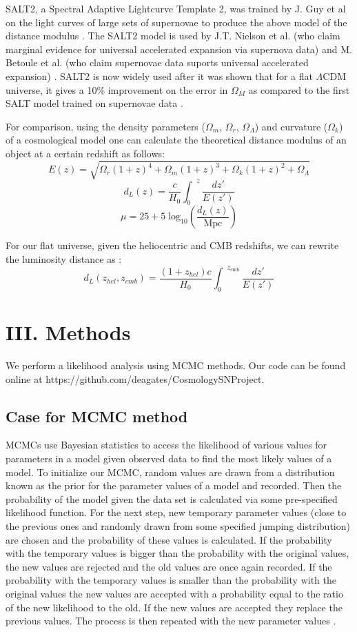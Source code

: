 \documentclass[aps,prl,reprint]{revtex4-1}
\begin{document}
SALT2, a Spectral Adaptive Lightcurve Template 2, was trained by J. Guy et al on the light curves of large sets of supernovae to produce the above model of the distance modulus \cite{salt2}. The SALT2 model is used by J.T. Nielson et al. (who claim marginal evidence for universal accelerated expansion via supernova data) and M. Betoule et al. (who claim supernovae data suports universal accelerated expansion) \cite{shocker,sdss}. SALT2 is now widely used after it was shown that for a flat $\Lambda$CDM universe, it gives a 10\% improvement on the error in $\Omega_M$ as compared to the first SALT model trained on supernovae data \cite{salt2}.

For comparison, using the density parameters ($\Omega_m$, $\Omega_{r}$, $\Omega_{\Lambda}$) and curvature ($\Omega_k$) of a cosmological model one can calculate the theoretical distance modulus of an object at a certain redshift as follows:  
$$E(z)=\sqrt{\Omega_{r}(1+z)^4 + \Omega_m(1+z)^3 + \Omega_k(1+z)^2 + \Omega_{\Lambda}} $$
$$d_L(z)=\frac{c}{H_0} {\int_0}^z \frac{dz'}{E(z')} $$
\begin{equation}
\mu = 25 + 5\;\text{log}_{10} \left( \frac{d_L(z)}{\text{Mpc}} \right) 
\end{equation}

For our flat universe, given the heliocentric and CMB redshifts, we can rewrite the luminosity distance as \cite{miao}:
$$d_L(z_{hel},z_{cmb})=\frac{(1+z_{hel}) c}{H_0}{\int_0}^{z_\text{cmb}} \frac{dz'}{E(z')}$$

\section{III. Methods}
We perform a likelihood analysis using MCMC methods. Our code can be found online at https://github.com/deagates/CosmologySNProject.
\subsection{Case for MCMC method}
MCMCs use Bayesian statistics to access the likelihood of various values for parameters in a model given observed data to find the most likely values of a model.
To initialize our MCMC, random values are drawn from a distribution known as the prior for the parameter values of a model and recorded. Then the probability of the model given the data set is calculated via some pre-specified likelihood function. For the next step, new temporary parameter values (close to the previous ones and randomly drawn from some specified jumping distribution) are chosen and the probability of these values is calculated. If the probability with the temporary values is bigger than the probability with the original values, the new values are rejected and the old values are once again recorded. If the probability with the temporary values is smaller than the probability with the original values the new values are accepted with a probability equal to the ratio of the new likelihood to the old. If the new values are accepted they replace the previous values. The process is then repeated with the new parameter values \cite{lecture}.
\end{document}
